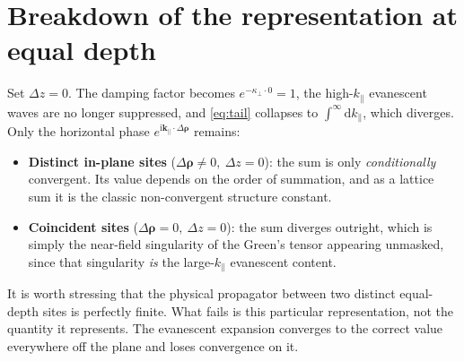 \documentclass[11pt,a4paper]{article}
\newcommand{\rd}{\mathrm{d}}
\newcommand{\ii}{\mathrm{i}}
\newcommand{\kpar}{\mathbf{k}_{\parallel}}
\newcommand{\brho}{\boldsymbol{\rho}}
\begin{document}
\section{Breakdown of the representation at equal depth}

Set $\Delta z=0$. The damping factor becomes $e^{-\kappa_\perp\cdot 0}=1$, the high-$k_\parallel$
evanescent waves are no longer suppressed, and \eqref{eq:tail} collapses to
$\int^{\infty}\rd k_\parallel$, which diverges. Only the horizontal phase
$e^{\ii\kpar\cdot\Delta\brho}$ remains:
\begin{itemize}
  \item \textbf{Distinct in-plane sites} ($\Delta\brho\neq 0,\ \Delta z=0$): the sum is only
  \emph{conditionally} convergent. Its value depends on the order of summation, and as a
  lattice sum it is the classic non-convergent structure constant.
  \item \textbf{Coincident sites} ($\Delta\brho=0,\ \Delta z=0$): the sum diverges outright,
  which is simply the near-field singularity of the Green's tensor appearing unmasked, since
  that singularity \emph{is} the large-$k_\parallel$ evanescent content.
\end{itemize}
It is worth stressing that the physical propagator between two distinct equal-depth sites is
perfectly finite. What fails is this particular representation, not the quantity it
represents. The evanescent expansion converges to the correct value everywhere off the plane
and loses convergence on it.
\end{document}
